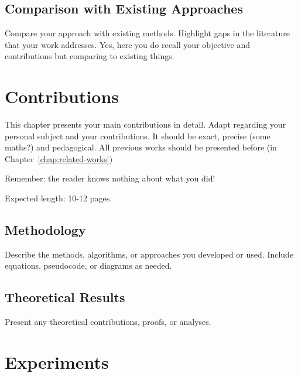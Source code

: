 \documentclass[12pt, a4paper]{report}
\begin{document}
\section{Comparison with Existing Approaches}
\label{sec:comparison}

Compare your approach with existing methods. 
Highlight gaps in the literature that your work addresses.
Yes, here you do recall your objective and contributions but comparing to existing things. 

\lipsum
\lipsum
\lipsum
\lipsum[1-3]


\chapter{Contributions}
\label{chap:contribution}

This chapter presents your main contributions in detail. 
Adapt regarding your personal subject and your contributions. 
It should be exact, precise (some maths?) and pedagogical. 
All previous works should be presented before (in Chapter~\ref{chap:related-works})

Remember: the reader knows nothing about what you did!

Expected length: 10-12 pages.

\section{Methodology}
\label{sec:methodology}

Describe the methods, algorithms, or approaches you developed or used. 
Include equations, pseudocode, or diagrams as needed.

\section{Theoretical Results}
\label{sec:theoretical-results}

Present any theoretical contributions, proofs, or analyses.

\lipsum
\lipsum
\lipsum
\lipsum
\lipsum
\lipsum
\lipsum



\chapter{Experiments}
\label{chap:experiments}
\end{document}
